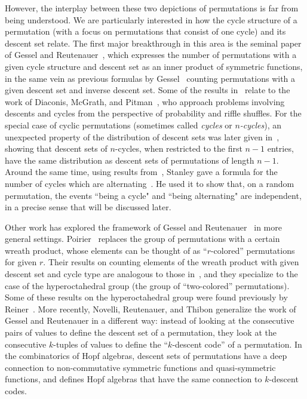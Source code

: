 \documentclass[12pt]{article}
\theoremstyle{definition}
\begin{document}
However, the interplay between these two depictions of permutations is far from being understood. 
We are particularly interested in how the cycle structure of a permutation (with a focus on permutations that consist of one cycle) and its descent set relate.
The first major breakthrough in this area is the seminal paper of Gessel and Reutenauer~\cite{GR}, which expresses the number of permutations with a given cycle structure and descent set as an inner product of symmetric functions,
in the same vein as previous formulas by Gessel~\cite{Gessel} counting permutations with a given descent set and inverse descent set.
Some of the results in~\cite{GR} relate to the work of Diaconis, McGrath, and Pitman~\cite{DMP}, who approach problems involving descents and cycles from the perspective of probability and riffle shuffles. For the special case of cyclic permutations (sometimes called {\em cycles} or {\em $n$-cycles}), an unexpected property of the distribution of descent sets was later given in~\cite{Elizalde}, showing that descent sets of $n$-cycles, when restricted to the first $n-1$ entries, have the same distribution as descent sets of permutations of length $n-1$. Around the same time, using results from~\cite{GR}, Stanley gave a formula for the number of cycles which are alternating~\cite{StanleySurvey}. He used it to show that, on a random permutation, the events ``being a cycle" and ``being alternating" are independent, in a precise sense that will be discussed later.

Other work has explored the framework of Gessel and Reutenauer~\cite{GR} in more general settings. Poirier~\cite{PoirierThesis,Poirier} replaces the group of permutations with a certain wreath product, whose elements can be thought of as ``$r$-colored'' permutations for given $r$. Their results on counting elements of the wreath product with given descent set and cycle type are analogous to those in~\cite{GR}, and they specialize to the case of the hyperoctahedral group (the group of ``two-colored'' permutations). Some of these results on the hyperoctahedral group were found previously by Reiner~\cite{Reiner}. More recently, Novelli, Reutenauer, and Thibon \cite{NRT} generalize the work of Gessel and Reutenauer in a different way: instead of looking at the consecutive pairs of values to define the descent set of a permutation, they look at the consecutive $k$-tuples of values to define the ``$k$-descent code'' of a permutation. In the combinatorics of Hopf algebras, descent sets of permutations have a deep connection to non-commutative symmetric functions and quasi-symmetric functions, and \cite{NRT} defines Hopf algebras that have the same connection to $k$-descent codes.
\end{document}
